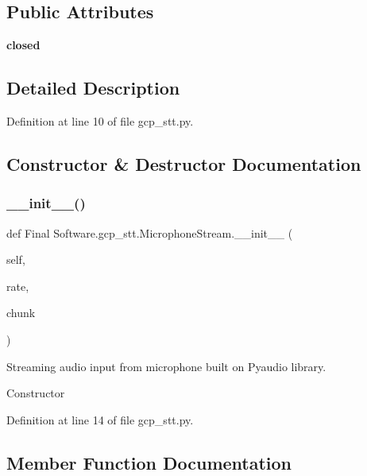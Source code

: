 \subsection*{Public Attributes}
\begin{DoxyCompactItemize}
\item 
\textbf{ closed}
\end{DoxyCompactItemize}


\subsection{Detailed Description}


Definition at line 10 of file gcp\+\_\+stt.\+py.



\subsection{Constructor \& Destructor Documentation}
\mbox{\label{class_final_01_software_1_1gcp__stt_1_1_microphone_stream_a3fd2d755da472a95676667d6db7340eb}} 
\subsubsection{\_\_init\_\_()}
{\footnotesize\ttfamily def Final Software.\+gcp\+\_\+stt.\+Microphone\+Stream.\+\_\+\+\_\+init\+\_\+\+\_\+ (\begin{DoxyParamCaption}\item[{}]{self,  }\item[{}]{rate,  }\item[{}]{chunk }\end{DoxyParamCaption})}



Streaming audio input from microphone built on Pyaudio library. 

Constructor 

Definition at line 14 of file gcp\+\_\+stt.\+py.



\subsection{Member Function Documentation}
\mbox{\label{class_final_01_software_1_1gcp__stt_1_1_microphone_stream_a40c1f1194a6e56aaf19826d9ca4b5c55}} 
